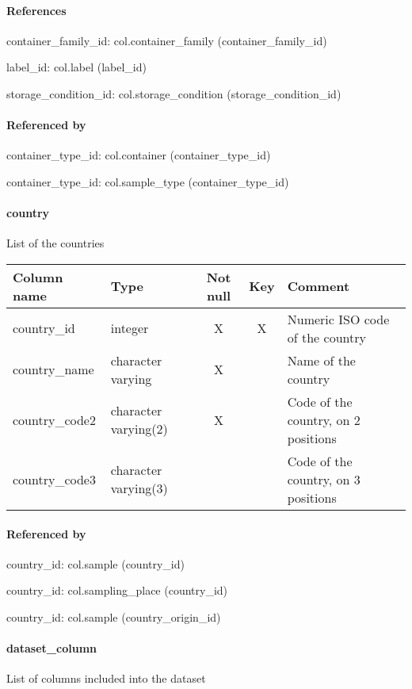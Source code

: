 \paragraph{References}
container\_family\_id: col.container\_family (container\_family\_id)

label\_id: col.label (label\_id)

storage\_condition\_id: col.storage\_condition (storage\_condition\_id)

\paragraph{Referenced by}
container\_type\_id: col.container (container\_type\_id)

container\_type\_id: col.sample\_type (container\_type\_id)

\paragraph{country}
List of the countries

\begin{tabular}{|l| p{2cm}|c|c| p{5cm}|}
\hline
Column name & Type & Not null & Key & Comment \\
\hline
country\_id & integer & X & X & Numeric ISO code of the country\\
country\_name & character varying & X &  & Name of the country\\
country\_code2 & character varying(2) & X &  & Code of the country, on 2 positions\\
country\_code3 & character varying(3) &  &  & Code of the country, on 3 positions\\
\hline
\end{tabular}
\paragraph{Referenced by}
country\_id: col.sample (country\_id)

country\_id: col.sampling\_place (country\_id)

country\_id: col.sample (country\_origin\_id)

\paragraph{dataset\_column}
List of columns included into the dataset

